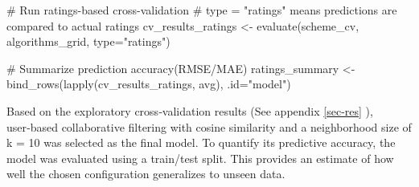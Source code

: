 \documentclass[
  12pt]{article}
\newenvironment{Shaded}{\begin{snugshade}}{\end{snugshade}}
\newcommand{\AttributeTok}[1]{\textcolor[rgb]{0.40,0.45,0.13}{#1}}
\newcommand{\CommentTok}[1]{\textcolor[rgb]{0.37,0.37,0.37}{#1}}
\newcommand{\FunctionTok}[1]{\textcolor[rgb]{0.28,0.35,0.67}{#1}}
\newcommand{\NormalTok}[1]{\textcolor[rgb]{0.00,0.23,0.31}{#1}}
\newcommand{\OtherTok}[1]{\textcolor[rgb]{0.00,0.23,0.31}{#1}}
\newcommand{\StringTok}[1]{\textcolor[rgb]{0.13,0.47,0.30}{#1}}
\begin{document}
\begin{Shaded}
\begin{Highlighting}[]
\CommentTok{\# Run ratings{-}based cross{-}validation}
\CommentTok{\# type = "ratings" means predictions are compared to actual ratings}
\NormalTok{cv\_results\_ratings }\OtherTok{\textless{}{-}} \FunctionTok{evaluate}\NormalTok{(scheme\_cv, }
\NormalTok{                                     algorithms\_grid, }
                                     \AttributeTok{type=}\StringTok{"ratings"}\NormalTok{)}

\CommentTok{\# Summarize prediction accuracy(RMSE/MAE)}
\NormalTok{ratings\_summary }\OtherTok{\textless{}{-}} \FunctionTok{bind\_rows}\NormalTok{(}\FunctionTok{lapply}\NormalTok{(cv\_results\_ratings, avg), }
                                   \AttributeTok{.id=}\StringTok{"model"}\NormalTok{)}
\end{Highlighting}
\end{Shaded}

Based on the exploratory cross‑validation results (See appendix
\ref{sec-res} ), user‑based collaborative filtering with cosine
similarity and a neighborhood size of k = 10 was selected as the final
model. To quantify its predictive accuracy, the model was evaluated
using a train/test split. This provides an estimate of how well the
chosen configuration generalizes to unseen data.
\end{document}
